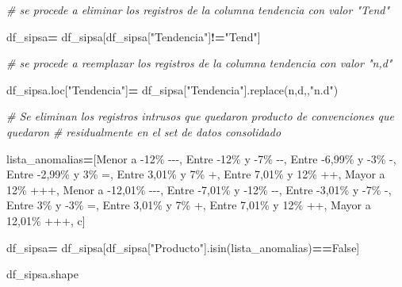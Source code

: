 \documentclass[
]{book}
\newenvironment{Shaded}{\begin{snugshade}}{\end{snugshade}}
\newcommand{\CommentTok}[1]{\textcolor[rgb]{0.56,0.35,0.01}{\textit{#1}}}
\newcommand{\NormalTok}[1]{#1}
\newcommand{\OperatorTok}[1]{\textcolor[rgb]{0.81,0.36,0.00}{\textbf{#1}}}
\newcommand{\StringTok}[1]{\textcolor[rgb]{0.31,0.60,0.02}{#1}}
\newcommand{\VariableTok}[1]{\textcolor[rgb]{0.00,0.00,0.00}{#1}}
\begin{document}
\begin{Shaded}
\begin{Highlighting}[]

\CommentTok{\# se procede a eliminar los registros de la columna tendencia con valor "Tend"}

\NormalTok{df\_sipsa}\OperatorTok{=}\NormalTok{ df\_sipsa[df\_sipsa[}\StringTok{"Tendencia"}\NormalTok{]}\OperatorTok{!=}\StringTok{"Tend"}\NormalTok{]}

\CommentTok{\# se procede a reemplazar los registros de la columna tendencia con valor "n,d"}

\NormalTok{df\_sipsa.loc[}\StringTok{"Tendencia"}\NormalTok{]}\OperatorTok{=}\NormalTok{ df\_sipsa[}\StringTok{"Tendencia"}\NormalTok{].replace(}\StringTok{\textquotesingle{}n,d,\textquotesingle{}}\NormalTok{,}\StringTok{"n.d"}\NormalTok{)}

\CommentTok{\# Se eliminan los registros intrusos que quedaron producto de convenciones que quedaron }
\CommentTok{\# residualmente en el set de datos consolidado}

\NormalTok{lista\_anomalias}\OperatorTok{=}\NormalTok{[}\StringTok{\textquotesingle{}Menor a {-}12\%                    {-}{-}{-}\textquotesingle{}}\NormalTok{,}
                \StringTok{\textquotesingle{}Entre {-}12\% y {-}7\%               {-}{-}\textquotesingle{}}\NormalTok{,}
                \StringTok{\textquotesingle{}Entre {-}6,99\% y {-}3\%            {-}\textquotesingle{}}\NormalTok{,}
                 \StringTok{\textquotesingle{}Entre {-}2,99\% y 3\%              =\textquotesingle{}}\NormalTok{,}
                 \StringTok{\textquotesingle{}Entre 3,01\% y 7\%               +\textquotesingle{}}\NormalTok{,}
                 \StringTok{\textquotesingle{}Entre 7,01\% y 12\%             ++\textquotesingle{}}\NormalTok{,}
                 \StringTok{\textquotesingle{}Mayor a 12\%                      +++\textquotesingle{}}\NormalTok{,}
                 \StringTok{\textquotesingle{}Menor a {-}12,01\%              {-}{-}{-}\textquotesingle{}}\NormalTok{,}
                 \StringTok{\textquotesingle{}Entre {-}7,01\% y {-}12\%         {-}{-}\textquotesingle{}}\NormalTok{,}
                 \StringTok{\textquotesingle{}Entre {-}3,01\% y {-}7\%           {-}\textquotesingle{}}\NormalTok{,}
                 \StringTok{\textquotesingle{}Entre 3\% y {-}3\%                 =\textquotesingle{}}\NormalTok{,}
                 \StringTok{\textquotesingle{}Entre 3,01\% y 7\%             +\textquotesingle{}}\NormalTok{,}
                 \StringTok{\textquotesingle{}Entre 7,01\% y 12\%           ++\textquotesingle{}}\NormalTok{,}
                 \StringTok{\textquotesingle{}Mayor a 12,01\%               +++\textquotesingle{}}\NormalTok{,}
                 \StringTok{\textquotesingle{}c\textquotesingle{}}\NormalTok{]}

\NormalTok{df\_sipsa}\OperatorTok{=}\NormalTok{ df\_sipsa[df\_sipsa[}\StringTok{"Producto"}\NormalTok{].isin(lista\_anomalias)}\OperatorTok{==}\VariableTok{False}\NormalTok{]}


\NormalTok{df\_sipsa.shape}
\end{Highlighting}
\end{Shaded}
\end{document}
